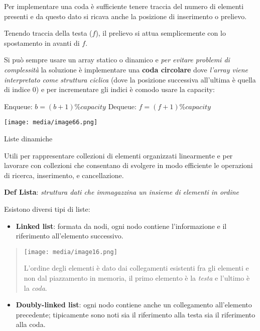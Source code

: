Per implementare una coda è sufficiente tenere traccia del numero di
elementi presenti e da questo dato si ricava anche la posizione di
inserimento o prelievo.

Tenendo traccia della testa (\(f\)), il prelievo si attua semplicemente
con lo spostamento in avanti di \(f\).

Si può sempre usare un array statico o dinamico e \emph{per evitare
problemi di complessità} la soluzione è implementare una \textbf{coda
circolare} dove \emph{l'array viene interpretato come struttura ciclica}
(dove la posizione successiva all'ultima è quella di indice 0) e per
incrementare gli indici è comodo usare la capacity:

Enqueue: \(b = (b + 1)\% capacity\) \textbar{} Dequeue:
\(f = (f + 1)\% capacity\)

\texttt{[image: media/image66.png]}

Liste dinamiche

Utili per rappresentare collezioni di elementi organizzati linearmente e
per lavorare con collezioni che consentano di svolgere in modo
efficiente le operazioni di ricerca, inserimento, e cancellazione.

\textbf{Def \textbar{} Lista}: \emph{struttura dati che immagazzina un
insieme di elementi in ordine}

Esistono diversi tipi di liste:

\begin{itemize}
\item
  \textbf{Linked list}: formata da nodi, ogni nodo contiene
  l'informazione e il riferimento all'elemento successivo.
\end{itemize}

\begin{quote}
\texttt{[image: media/image16.png]}

L'ordine degli elementi è dato dai collegamenti esistenti fra gli
elementi e non dal piazzamento in memoria, il primo elemento è la
\emph{testa} e l'ultimo è la \emph{coda}.
\end{quote}

\begin{itemize}
\item
  \textbf{Doubly-linked list}: ogni nodo contiene anche un collegamento
  all'elemento precedente; tipicamente sono noti sia il riferimento alla
  testa sia il riferimento alla coda.
\end{itemize}

